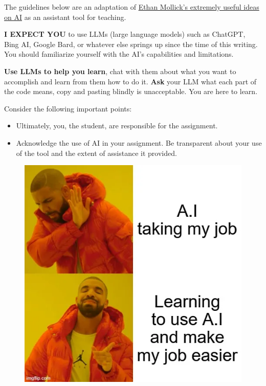 \documentclass[
  letterpaper,
  DIV=11,
  numbers=noendperiod,
  oneside]{scrreprt}
\providecommand{\tightlist}{%
  \setlength{\itemsep}{0pt}\setlength{\parskip}{0pt}}\usepackage{longtable,booktabs,array}
\begin{document}
The guidelines below are an adaptation of
\href{https://oneusefulthing.substack.com/p/all-my-classes-suddenly-became-ai}{Ethan
Mollick's extremely useful ideas on AI} as an assistant tool for
teaching.

\textbf{I EXPECT YOU} to use LLMs (large language models) such as
ChatGPT, Bing AI, Google Bard, or whatever else springs up since the
time of this writing. You should familiarize yourself with the AI's
capabilities and limitations.

\textbf{Use LLMs to help you learn}, chat with them about what you want
to accomplish and learn from them how to do it. \textbf{Ask} your LLM
what each part of the code means, copy and pasting blindly is
unacceptable. You are here to learn.

Consider the following important points:

\begin{itemize}
\tightlist
\item
  Ultimately, you, the student, are responsible for the assignment.
\item
  Acknowledge the use of AI in your assignment. Be transparent about
  your use of the tool and the extent of assistance it provided.
\end{itemize}

\begin{figure}

{\centering \includegraphics{basics/ai-meme1.png}

}

\end{figure}
\end{document}
